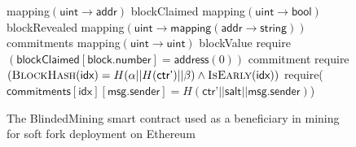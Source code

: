 \begin{figure}
\begin{algorithm}[H]
    \caption{\label{alg.blinded-contract}The \textsf{BlindedMining} smart
    contract used as a beneficiary in mining for soft fork deployment on Ethereum}
    \begin{algorithmic}[1]

          \State\textsf{mapping}$(\textsf{uint} \rightarrow \textsf{addr})$ \textsf{blockClaimed}
          \State\textsf{mapping}$(\textsf{uint} \rightarrow \textsf{bool})$ \textsf{blockRevealed}
          \State\textsf{mapping}$(\textsf{uint} \rightarrow \textsf{mapping}(\textsf{addr} \rightarrow \textsf{string}))$ \textsf{commitments}
          \State\textsf{mapping}$(\textsf{uint} \rightarrow \textsf{uint})$ \textsf{blockValue}
%
          \Payable{$\oplus$}{}
          \EndPayable
             \State \textsf{require}$(\textsf{blockClaimed}[\textsf{block.number}] = \textsf{address}(0))$
          \EndFunction
             \State{}
          \EndFunction
             \State{}
          \EndFunction
             \State{}
          \EndFunction
              {\textsf{commitment}}
          \EndFunction
             \State \textsf{require}$(\textsc{BlockHash}(\textsf{idx}) = H(\alpha || H(\textsf{ctr'}) || \beta) \land \textsc{IsEarly}(\textsf{idx}))$
             \State\textsf{require}($\textsf{commitments}[\textsf{idx}][\textsf{msg.sender}] = H(\textsf{ctr'} || \textsf{salt} || \textsf{msg.sender})$)

\end{algorithmic}
\end{algorithm}
\end{figure}
